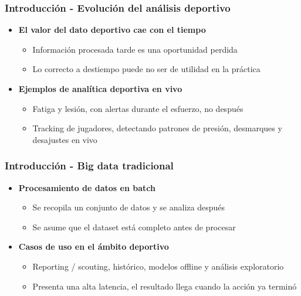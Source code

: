 \documentclass[aspectratio=169]{beamer}
\begin{document}
\begin{frame}\frametitle{Introducción - Evolución del análisis deportivo}
	\begin{itemize}
		\item \textbf{El valor del dato deportivo cae con el tiempo}
		\begin{itemize}
      \item Información procesada tarde es una oportunidad perdida
      \item Lo correcto a destiempo puede no ser de utilidad en la práctica
    \end{itemize}

    \vspace{1em}
      
    \item \textbf{Ejemplos de analítica deportiva en vivo}
		\begin{itemize}
			\item Fatiga y lesión, con alertas durante el esfuerzo, no después
			\item Tracking de jugadores, detectando patrones de presión, desmarques y desajustes en vivo
		\end{itemize}
	\end{itemize}
\end{frame}

\begin{frame}
\frametitle{Introducción - Big data tradicional}
	\begin{itemize}
		\item \textbf{Procesamiento de datos en batch}
		\begin{itemize}
			\item Se recopila un conjunto de datos y se analiza después
			\item Se asume que el dataset está completo antes de procesar
		\end{itemize}

		\vspace{1em}

		\item \textbf{Casos de uso en el ámbito deportivo}
		\begin{itemize}
			\item Reporting / scouting, histórico, modelos offline y análisis exploratorio
			\item Presenta una alta latencia, el resultado llega cuando la acción ya terminó
		\end{itemize}
	\end{itemize}
\end{frame}
\end{document}
